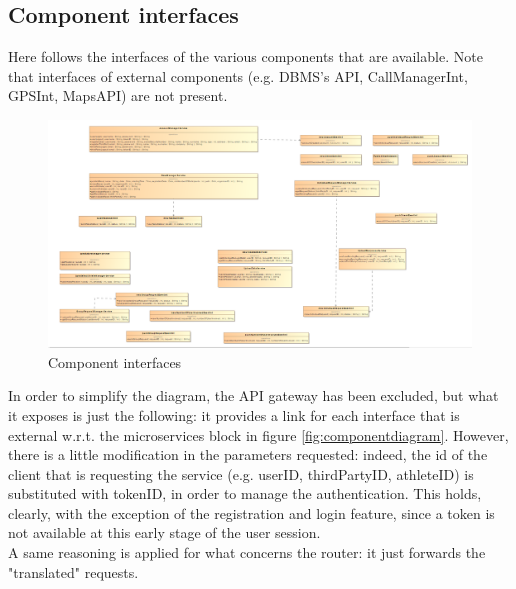 \subsection{Component interfaces}
Here follows the interfaces of the various components that are available. 
Note that interfaces of external components (e.g. DBMS's API, CallManagerInt, GPSInt, MapsAPI) are not present. 

\begin{figure}[H]
\includegraphics[width=\linewidth]{Images/componentinterfaces.png}
\caption{ Component interfaces }
\label{fig:componentinterface}
\end{figure}

In order to simplify the diagram, the API gateway has been excluded, but what it exposes is just the following: it provides a link for each
interface that is external w.r.t. the microservices block in figure \ref{fig:componentdiagram}. However, there is a little modification in the
parameters requested: indeed, the id of the client that is requesting the service (e.g. userID, thirdPartyID, athleteID) is substituted with
tokenID, in order to manage the authentication. This holds, clearly, with the exception of the registration and login feature, since a token 
is not available at this early stage of the user session. \\ 
A same reasoning is applied for what concerns the router: it just forwards the "translated" requests.
